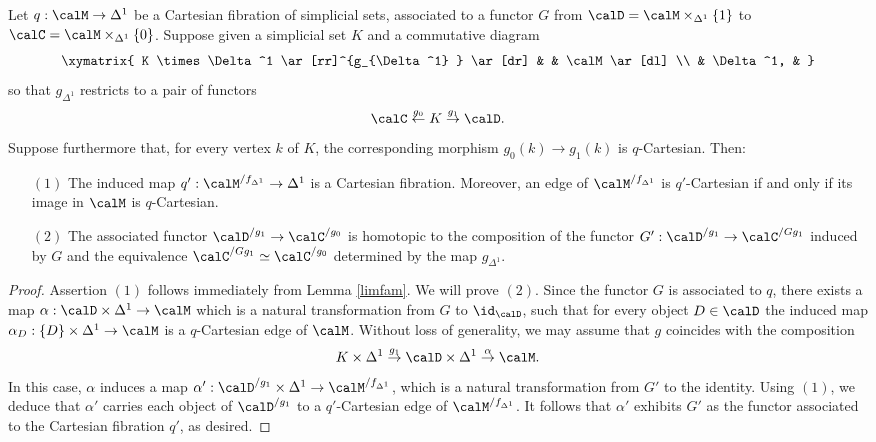 \begin{lemma}\label{spitfure} Let $q: \calM \rightarrow \Delta^1$ be a 
Cartesian fibration of simplicial sets, associated to a functor $G$ from 
$\calD = \calM \times_{ \Delta^1} \{1\}$ to $\calC = \calM 
\times_{\Delta^1} \{0\}$. Suppose given a simplicial set $K$ 
and a commutative diagram
$$ \xymatrix{ K \times \Delta^1 \ar[rr]^{g_{\Delta^1} } \ar[dr] & & \calM 
\ar[dl] \\
& \Delta^1, & }$$
so that $g_{\Delta^1}$ restricts to a pair of functors
$$ \calC \stackrel{g_0}{\leftarrow} K \stackrel{g_1}{\rightarrow} \calD.$$
Suppose furthermore that, for every vertex $k$ of $K$, the corresponding 
morphism $g_0(k) \rightarrow g_1(k)$ is $q$-Cartesian. Then:
\begin{itemize}
\item[$(1)$] The induced map $q': \calM^{ / f_{\Delta^1} } \rightarrow \Delta^1$ is a Cartesian fibration.
Moreover, an edge of $\calM^{/ f_{\Delta^1}}$ is $q'$-Cartesian if and only if its image in
$\calM$ is $q$-Cartesian.
\item[$(2)$] The associated functor $\calD^{/g_1} \rightarrow 
\calC^{/g_0}$ is 
homotopic to the composition of the functor $G': \calD^{/g_1} \rightarrow 
\calC^{/Gg_1}$ induced by $G$ and the equivalence
$\calC^{/Gg_1} \simeq \calC^{/g_0}$ determined by the map $g_{\Delta^1}$.
\end{itemize}
\end{lemma}

\begin{proof} Assertion $(1)$ follows immediately from Lemma \ref{limfam}. 
We will prove $(2)$. Since the functor $G$ is associated to $q$, there 
exists a map $\alpha: \calD \times \Delta^1 \rightarrow \calM$ which is a 
natural transformation from $G$ to $\id_{\calD}$, such that for every 
object $D \in \calD$ the induced map $\alpha_{D}: \{D \} \times \Delta^1 
\rightarrow \calM$ is a $q$-Cartesian edge of $\calM$. Without loss of 
generality, we may assume that $g$
coincides with the composition
$$ K \times \Delta^1 \stackrel{g_1}{\rightarrow} \calD \times \Delta^1
\stackrel{\alpha}{\rightarrow} \calM.$$
In this case, $\alpha$ 
induces a map $\alpha': \calD^{/g_1} \times \Delta^1 \rightarrow 
\calM^{/f_{\Delta^1}}$, which is a natural transformation from $G'$ to the 
identity. Using $(1)$, we deduce that $\alpha'$ carries each object of 
$\calD^{/g_1}$ to a $q'$-Cartesian edge of $\calM^{/ f_{\Delta^1}}$. It 
follows that $\alpha'$ exhibits $G'$ as the functor associated to the 
Cartesian fibration $q'$, as desired. \end{proof}

